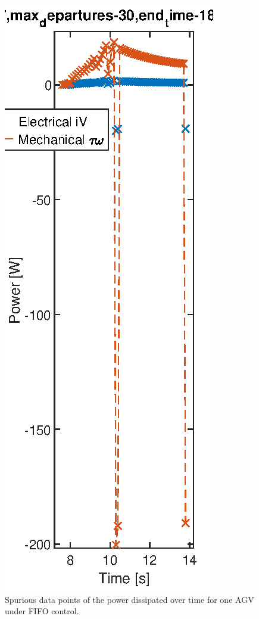 \documentclass[]{article}
\begin{document}
\begin{figure}
	\includegraphics[width=0.45\linewidth]{agv_e_021088_power_-FIFO-HighLatency-HighTraffic_zoom_out.eps}
	\caption{Spurious data points of the power dissipated over time for one AGV under FIFO control.}
	\label{fig:021088power_spurious}       %
\end{figure}
\end{document}
